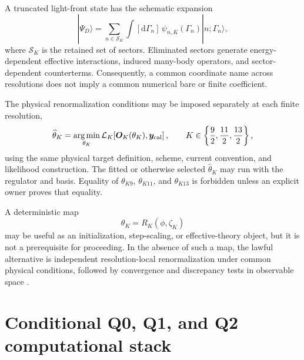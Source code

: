 \documentclass[11pt,oneside]{book}
\newcommand{\dd}{\mathrm{d}}
\begin{document}
A truncated light-front state has the schematic expansion
\begin{equation}
 |\Psi_D\rangle
 =\sum_{n\in\mathcal S_K}\int[\dd\Gamma_n]\,
 \psi_{n,K}(\Gamma_n)|n;\Gamma_n\rangle,
 \label{eq:fock-expansion}
\end{equation}
where $\mathcal S_K$ is the retained set of sectors.  Eliminated sectors generate energy-dependent effective interactions, induced many-body operators, and sector-dependent counterterms.  Consequently, a common coordinate name across resolutions does not imply a common numerical bare or finite coefficient.

The physical renormalization conditions may be imposed separately at each finite resolution,
\begin{equation}
 \widehat\theta_K
 =\operatorname*{arg\,min}_{\theta_K}
 \mathcal L_K\!\left[\bm O_K(\theta_K),\bm y_{\rm cal}\right],
 \qquad K\in\left\{\frac92,\frac{11}{2},\frac{13}{2}\right\},
 \label{eq:resolution-local-renormalization}
\end{equation}
using the same physical target definition, scheme, current convention, and likelihood construction.  The fitted or otherwise selected $\widehat\theta_K$ may run with the regulator and basis.  Equality of $\theta_{K9}$, $\theta_{K11}$, and $\theta_{K13}$ is forbidden unless an explicit owner proves that equality.

A deterministic map
\begin{equation}
 \theta_K=R_K(\phi,\zeta_K)
 \label{eq:resolution-map}
\end{equation}
may be useful as an initialization, step-scaling, or effective-theory object, but it is not a prerequisite for proceeding.  In the absence of such a map, the lawful alternative is independent resolution-local renormalization under common physical conditions, followed by convergence and discrepancy tests in observable space \cite{GlazekWilson1993,Wilson1994,KarmanovMathiotSmirnov2008,DWC400S2Record2026}.

\section{Conditional Q0, Q1, and Q2 computational stack}
\end{document}
